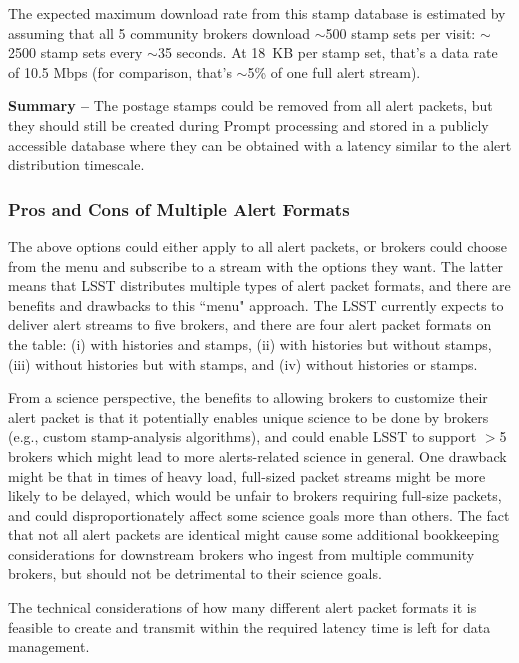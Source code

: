 \documentclass[DM,lsstdraft,authoryear,toc]{lsstdoc}
\begin{document}
The expected maximum download rate from this stamp database is estimated by assuming that all 5 community brokers download $\sim$500 stamp sets per visit: $\sim$2500 stamp sets every $\sim$35 seconds. At 18~KB per stamp set, that's a data rate of 10.5 Mbps (for comparison, that's $\sim$5\% of one full alert stream).

{\bf Summary --} The postage stamps could be removed from all alert packets, but they should still be created during Prompt processing and stored in a publicly accessible database where they can be obtained with a latency similar to the alert distribution timescale.


\subsubsection{Pros and Cons of Multiple Alert Formats}\label{sssec:packets_remove_procon}

The above options could either apply to all alert packets, or brokers could choose from the menu and subscribe to a stream with the options they want.
The latter means that LSST distributes multiple types of alert packet formats, and there are benefits and drawbacks to this ``menu" approach.
The LSST currently expects to deliver alert streams to five brokers, and there are four alert packet formats on the table: (i) with histories and stamps, (ii) with histories but without stamps, (iii) without histories but with stamps, and (iv) without histories or stamps. 

From a science perspective, the benefits to allowing brokers to customize their alert packet is that it potentially enables unique science to be done by brokers (e.g., custom stamp-analysis algorithms), and could enable LSST to support $>$5 brokers which might lead to more alerts-related science in general.
One drawback might be that in times of heavy load, full-sized packet streams might be more likely to be delayed, which would be unfair to brokers requiring full-size packets, and could disproportionately affect some science goals more than others.
The fact that not all alert packets are identical might cause some additional bookkeeping considerations for downstream brokers who ingest from multiple community brokers, but should not be detrimental to their science goals.

The technical considerations of how many different alert packet formats it is feasible to create and transmit within the required latency time is left for data management.
\end{document}
